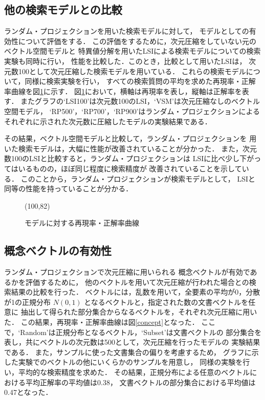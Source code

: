 \subsection{他の検索モデルとの比較}
ランダム・プロジェクションを用いた検索モデルに対して，
モデルとしての有効性について評価をする．
この評価をするために，次元圧縮をしていない元のベクトル空間モデルと
特異値分解を用いたLSIによる検索モデルについての検索実験も同時に行い，
性能を比較した．このとき，比較として用いたLSIは，
次元数100として次元圧縮した検索モデルを用いている．
これらの検索モデルについて，同様に検索実験を行い，
すべての検索質問の平均を求めた再現率・正解率曲線を図\ref{re_pre}に示す．
図\ref{re_pre}において，横軸は再現率を表し，縦軸は正解率を表す．
またグラフの`LSI100'は次元数100のLSI，`VSM'は次元圧縮なしのベクトル空間モデル，
`RP500'，`RP700'，`RP900'はランダム・プロジェクションによる
それぞれに示された次元数に圧縮したモデルの実験結果である．

その結果，ベクトル空間モデルと比較して，ランダム・プロジェクションを
用いた検索モデルは，大幅に性能が改善されていることが分かった．
また，次元数100のLSIと比較すると，ランダム・プロジェクションは
LSIに比べ少し下がってはいるものの，ほぼ同じ程度に検索精度が
改善されていることを示している．
このことから，ランダム・プロジェクションが検索モデルとして，
LSIと同等の性能を持っていることが分かる．
\begin{figure}[tb]
	\begin{center}
                 \atari(100,82)
		
	\end{center}
	\caption{モデルに対する再現率・正解率曲線}
	\label{re_pre}
\end{figure}

\subsection{概念ベクトルの有効性}
ランダム・プロジェクションで次元圧縮に用いられる
概念ベクトルが有効であるかを評価するために，
他のベクトルを用いて次元圧縮が行われた場合との検索結果の比較を行った．
ベクトルには，乱数を用いて，全要素の平均が0，分散が1の正規分布 $N(0, 1)$ 
となるベクトルと，指定された数の文書ベクトルを任意に
抽出して得られた部分集合からなるベクトルを，それぞれ次元圧縮に用いた．
この結果，再現率・正解率曲線は図\ref{concept}となった．
ここで，`Random'は正規分布となるベクトル，`Subset'は文書ベクトルの
部分集合を表し，共にベクトルの次元数は500として，次元圧縮を行ったモデルの
実験結果である．
また，サンプルに使った文書集合の偏りを考慮するため，
グラフに示した実験でのベクトルの他にいくらかのサンプルを用意し，
同様の実験を行い，平均的な検索精度を求めた．
その結果，正規分布による任意のベクトルにおける平均正解率の平均値は0.38，
文書ベクトルの部分集合における平均値は0.47となった．

